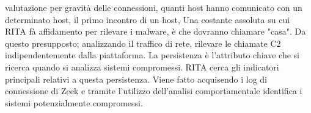 valutazione per gravità delle connessioni, %
quanti host hanno comunicato con un determinato host, %
il primo incontro di un host, %
\vspace{2ex} \newline 
Una costante assoluta su cui RITA fà affidamento per rilevare i malware, è che dovranno chiamare "casa". 
Da questo presupposto; analizzando il traffico di rete, rilevare le chiamate C2 indipendentemente dalla piattaforma. 
\vspace{2ex} \newline 
La persistenza è l'attributo chiave che si ricerca quando si analizza sistemi compromessi. 
RITA cerca gli indicatori principali relativi a questa persistenza. 
Viene fatto acquisendo i log di connessione di Zeek e tramite l'utilizzo dell'analisi comportamentale 
identifica i sistemi potenzialmente compromessi. 





